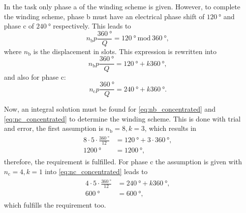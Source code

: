 \begin{solutionblock}
    In the task only phase a of the winding scheme is given. However, to complete the winding scheme, phase b must have an electrical phase shift of $\SI{120}{\degree}$ and phase c of $\SI{240}{\degree}$ respectively.
    This leads to
    \begin{equation}
        n_{\mathrm{b}} p \frac{\SI{360}{\degree}}{Q} = \SI{120}{\degree} \ \mathrm{mod} \ \SI{360}{\degree},
    \end{equation}
    where $n_{\mathrm{b}}$ is the displacement in slots. This expression is rewritten into
    \begin{equation}
        n_{\mathrm{b}} p \frac{\SI{360}{\degree}}{Q} = \SI{120}{\degree} + k \SI{360}{\degree},
        \label{eq:nb_concentrated}
    \end{equation}
    and also for phase c:
    \begin{equation}
        n_{\mathrm{c}} p \frac{\SI{360}{\degree}}{Q} = \SI{240}{\degree} + k \SI{360}{\degree}.
        \label{eq:nc_concentrated}
    \end{equation}

    Now, an integral solution must be found for \eqref{eq:nb_concentrated} and \eqref{eq:nc_concentrated} to determine the winding scheme.
    This is done with trial and error, the first assumption is $n_{\mathrm{b}} = 8, k = 3$, which results in
    \begin{align}
        \begin{split}
            8\cdot 5\cdot \frac{\SI{360}{\degree}}{12} & = \SI{120}{\degree}+3 \cdot \SI{360}{\degree}, \\
            \SI{1200}{\degree}                         & = \SI{1200}{\degree},
        \end{split}
    \end{align}
    therefore, the requirement is fulfilled. For phase c the assumption is given with $n_{\mathrm{c}} = 4, k = 1$ into \eqref{eq:nc_concentrated} leads to
    \begin{align}
        \begin{split}
            4 \cdot 5 \cdot \frac{\SI{360}{\degree}}{12} & = \SI{240}{\degree} + k \SI{360}{\degree}, \\
            \SI{600}{\degree}                            & = \SI{600}{\degree},
        \end{split}
    \end{align}
    which fulfills the requirement too.


\end{solutionblock}
